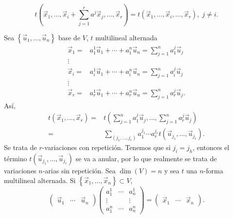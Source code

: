 \begin{fprop}[]
\normalfont 
\[t\left(\vec{x}_{1}, \ldots, \vec{x}_{i} + \sum^{r}_{j=1}a^{j}\vec{x}_{j}, \ldots, \vec{x}_{r}\right) = t\left(\vec{x}_{1}, \ldots, \vec{x}_{i}, \ldots, \vec{x}_{r}\right), \; j \neq i.\]
\end{fprop}
	Sea $\displaystyle \left\{ \vec{u}_{1}, \ldots, \vec{u}_{n}\right\}  $ base de $\displaystyle V $, $\displaystyle t $ multilineal alternada
\[
\begin{split}
	\vec{x}_{1} = & a^{1}_{1}\vec{u}_{1} + \cdots + a^{n}_{1}\vec{u}_{n} = \sum^{n}_{j=1}a^{j}_{1}\vec{u}_{j} \\
	\vdots & \\
	\vec{x}_{i} = & a^{1}_{i}\vec{u}_{1} + \cdots + a^{n}_{i}\vec{u}_{n} = \sum^{n}_{j=1}a^{j}_{i}\vec{u}_{j} \\
	\vdots & \\
	\vec{x}_{r} = & a^{1}_{r}\vec{u}_{1} + \cdots + a^{n}_{r}\vec{u}_{n} = \sum^{n}_{j=1}a^{j}_{r}\vec{u}_{j}.
\end{split}
\]
Así, 
\[
\begin{split}
	t\left(\vec{x}_{1}, \ldots, \vec{x}_{r}\right) = & t\left(\sum^{n}_{j=1}a^{j}_{1}\vec{u}_{j}, \ldots, \sum^{n}_{j=1}a^{j}_{r}\vec{u}_{j}\right) \\
	= & \sum_{\left(j_{1}, \ldots, j_{r}\right)}a^{j_{1}}_{1}\cdots a^{j_{r}}_{r}t\left(\vec{u}_{j_{1}}, \ldots, \vec{u}_{j_{r}}\right) .
\end{split}
\]
Se trata de $\displaystyle r $-variaciones con repetición. Tenemos que si $\displaystyle j_{i} = j_{h} $, entonces el término $\displaystyle t\left(\vec{u}_{j_{1}}, \ldots, \vec{u}_{j_{r}}\right) $ se va a anular, por lo que realmente se trata de variaciones $\displaystyle n $-arias sin repetición.
Sea $\displaystyle \dim\left(V\right) = n $ y sea $\displaystyle t $ una $\displaystyle n $-forma multilineal alternada. Si $\displaystyle \left\{ \vec{x}_{1}, \ldots, \vec{x}_{n}\right\} \subset V $, 
\[\begin{pmatrix} \vec{u}_{1} & \cdots & \vec{u}_{n} \end{pmatrix} \begin{pmatrix} a^{1}_{1} & \cdots & a^{1}_{n} \\
\vdots & & \vdots \\
a^{n}_{1} & \cdots & a^{n}_{n}\end{pmatrix} = \begin{pmatrix} \vec{x}_{1} & \cdots & \vec{x}_{n} \end{pmatrix}.\]

